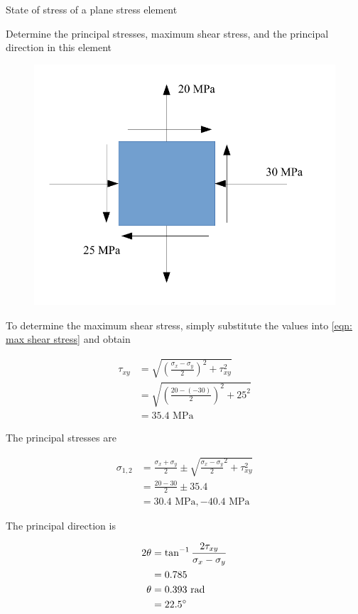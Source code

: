 \documentclass[
10pt,
a4paper,
openany,
svgnames,
]{book} %
\begin{document}
\begin{example} State of stress of a plane stress element \label{example: plane stress}
  
  Determine the principal stresses, maximum shear stress, and the principal direction in this element 

  \begin{figure}[H]
    \centering
    \includegraphics[scale=0.5]{pictures/Static-body-load-analysis/plane-stress-example}
    \caption[]{}
  \end{figure}
\end{example}
\begin{solution}
  To determine the maximum shear stress, simply substitute the values into \cref{eqn: max shear stress} and obtain
  
  \begin{align*}
    \tau_{xy} &= \sqrt {\left( \frac{\sigma_x - \sigma_y}{2} \right)^2 + \tau _{xy}^2}  \\ 
                 &= \sqrt {\left( \frac{20 - ( - 30)}{2} \right)^2 + 25^2}  \\ 
                 &= 35.4 \text{ MPa} 
  \end{align*}
  
  The principal stresses are

  \begin{align*}
    \sigma_{1,2} &= \frac{\sigma_x + \sigma _y}{2} \pm \sqrt {\frac{\sigma _x - \sigma_y}{2}^2 + \tau _{xy}^2}  \\ 
                    &= \frac{20 - 30}{2} \pm 35.4 \\ 
                    &= 30.4 \text{ MPa}, - 40.4 \text{ MPa} 
  \end{align*}
  
  The principal direction is

  \begin{align*}
    2\theta  &= \tan^{-1}\frac{2\tau_{xy}}{\sigma_x - \sigma_y} \\ 
             &= 0.785 \\ 
    \theta  &= 0.393 \text{ rad} \\ 
             &= 22.5\degree
  \end{align*}
\end{solution}
\end{document}
